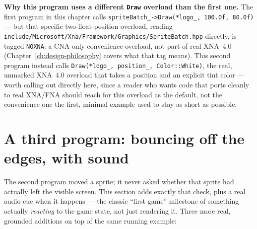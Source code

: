 \begin{sourcenote}
\textbf{Why this program uses a different \texttt{Draw} overload than the first one.} The
first program in this chapter calls \texttt{spriteBatch\_->Draw(*logo\_, 100.0f, 80.0f)} ---
but that specific two-float-position overload, reading
\texttt{include/\allowbreak{}Microsoft/\allowbreak{}Xna/\allowbreak{}Framework/\allowbreak{}Graphics/\allowbreak{}SpriteBatch.hpp} directly, is tagged
\texttt{NOXNA}: a CNA-only convenience overload, not part of real XNA~4.0
(Chapter~\ref{ch:design-philosophy} covers what that tag means). This second program instead
calls \texttt{Draw(*logo\_, position\_, Color::White)}, the real, unmarked XNA~4.0 overload
that takes a  position and an explicit tint color --- worth calling out
directly here, since a reader who wants code that ports cleanly to real XNA/FNA should reach
for this overload as the default, not the convenience one the first, minimal example used to
stay as short as possible.
\end{sourcenote}

\section{A third program: bouncing off the edges, with sound}

The second program moved a sprite; it never asked whether that sprite had actually left the
visible screen. This section adds exactly that check, plus a real audio cue when it happens
--- the classic ``first game'' milestone of something actually \emph{reacting} to the game
state, not just rendering it. Three more real, grounded additions on top of the same running
example:

